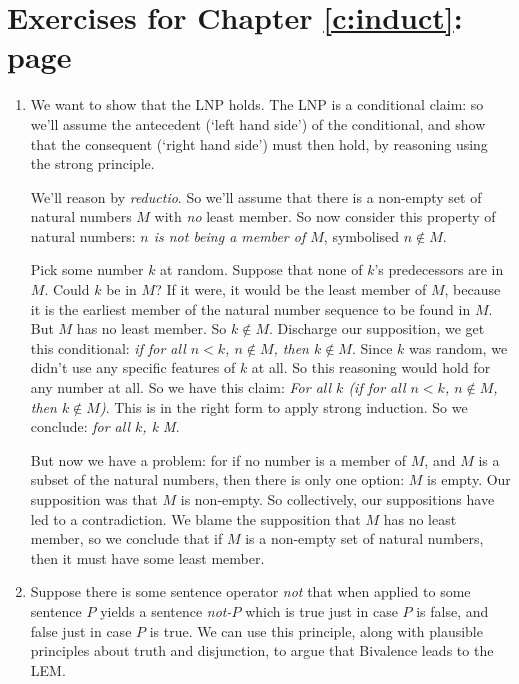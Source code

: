 
\section*{Exercises for Chapter \ref{c:induct}: page \pageref{ex1}} \label{ans1}

{\small
\begin{enumerate}
	\item We want to show that the LNP holds. The LNP is a conditional claim: so we'll assume the antecedent (`left hand side') of the conditional, and show that the consequent (`right hand side') must then hold, by reasoning using the strong principle.

	We'll reason by \emph{reductio}. So we'll assume that there is a non-empty set of natural numbers $M$ with \emph{no} least member. So now consider this property of natural numbers: \emph{$n$ is not being a member of $M$}, symbolised $n \notin M$.

	Pick some number $k$ at random. Suppose that none of $k$'s  predecessors are in $M$. Could $k$ be in $M$? If it were, it would be the least member of $M$, because it is the earliest member of the natural number sequence to be found in $M$. But $M$ has no least member. So $k\notin M$. Discharge our supposition, we get this conditional: \emph{if for all $n<k$, $n\notin M$, then $k\notin M$}. Since $k$ was random, we didn't use any specific features of $k$ at all. So this reasoning would hold for any number at all. So we have this claim: \emph{For all $k$ (if for all $n<k$, $n\notin M$, then $k\notin M$)}. This is in the right form to apply strong induction. So we conclude: \emph{for all $k$, k \notin M}.

	But now we have a problem: for if no number is a member of $M$, and $M$ is a subset of the natural numbers, then there is only one option: $M$ is empty. Our supposition was that $M$ is non-empty. So collectively,  our suppositions have led to a contradiction. We blame the supposition that $M$ has no least member, so we conclude that if $M$ is a non-empty set of natural numbers, then it must have some least member.

	 \item  Suppose there is some sentence operator \emph{not} that when applied to some sentence $P$ yields a sentence \emph{not-$P$} which is true just in case $P$ is false, and false just in case $P$ is true. We can use this principle, along with plausible principles about truth and disjunction, to argue that Bivalence leads to the LEM.


\end{enumerate}}
